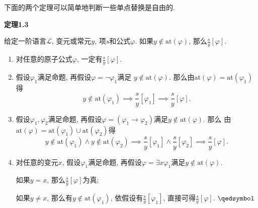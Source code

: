 \newpage

下面的两个定理可以简单地判断一些单点替换是自由的.



\vspace{10pt}

\hypertarget{sec:定理1.3}{}
\noindent\textbf{定理1.3}

给定一阶语言$\mathcal{L}$, 变元或常元$y$, 项$s$和公式$\varphi$.
如果$y\notin\mathrm{at}(\varphi)$, 那么$\displaystyle\frac{s}{y}[\varphi]$.


\begin{enumerate}
    \item 对任意的原子公式$\varphi$, 一定有$\displaystyle\frac{s}{y}[\varphi]$.
    
    \vspace{3pt}
    \item 假设$\varphi_1$满足命题, 再假设$\varphi=\neg\varphi_1$满足
    $y\notin\mathrm{at}(\varphi)$.
    那么由$\mathrm{at}(\varphi)=\mathrm{at}(\varphi_1)$得
    \vspace{3pt}
    \[
        y\notin\mathrm{at}(\varphi_1)\implies
        \frac{s}{y}[\varphi_1]\implies\frac{s}{y}[\varphi].
    \]

    \vspace{3pt}
    \item 假设$\varphi_1,\varphi_2$满足命题,
    再假设$\varphi=(\varphi_1\to\varphi_2)$满足$y\notin\mathrm{at}(\varphi)$. 那么
    由$\mathrm{at}(\varphi)=\mathrm{at}(\varphi_1)\cup\mathrm{at}(\varphi_2)$得
    \vspace{3pt}
    \[
        y\notin\mathrm{at}(\varphi_1)\land y\notin\mathrm{at}(\varphi_2)\implies
        \frac{s}{y}[\varphi_1]\land\frac{s}{y}[\varphi_2]\implies
        \frac{s}{y}[\varphi].
    \]

    \item 对任意的变元$x$, 假设$\varphi_1$满足命题,
    再假设$\varphi=\exists x\varphi_1$满足$y\notin\mathrm{at}(\varphi)$.

    \vspace{3pt}\hspace{2.17em}
    如果$y=x$, 那么$\displaystyle\frac{s}{y}[\varphi]$为真;

    \vspace{3pt}\hspace{2.17em}
    如果$y\neq x$, 那么有$y\notin\mathrm{at}(\varphi_1)$,
    依假设有$\displaystyle\frac{s}{y}[\varphi_1]$,
    直接可得$\displaystyle\frac{s}{y}[\varphi]$. \hfill $\qedsymbol$
\end{enumerate}

